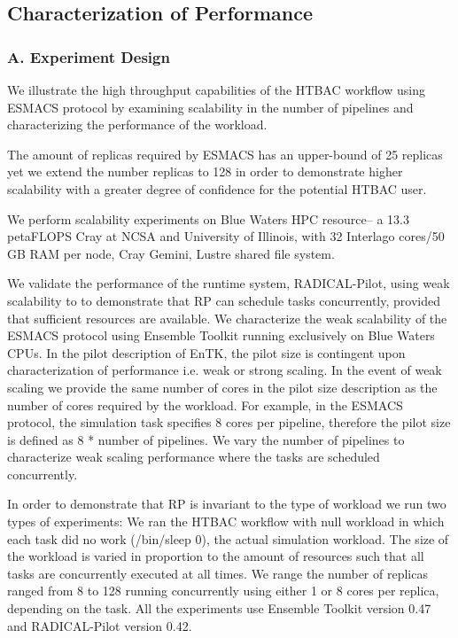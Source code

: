 \subsection{Characterization of Performance}

\subsubsection{A. Experiment Design}

We illustrate the high throughput capabilities of the HTBAC workflow using ESMACS protocol by examining scalability in the number of pipelines and characterizing the performance of the workload. 

The amount of replicas required by ESMACS has an upper-bound of 25 replicas yet we extend the number replicas to 128 in order to demonstrate higher scalability with a greater degree of confidence for the potential HTBAC user.   

We perform scalability experiments on Blue Waters HPC resource-- a 13.3 petaFLOPS Cray at NCSA and University of Illinois, with 32 Interlago cores/50 GB RAM per node, Cray Gemini, Lustre shared file system. 

We validate the performance of the runtime system, RADICAL-Pilot, using weak scalability to to demonstrate that RP can schedule tasks concurrently, provided that sufficient resources are available. We characterize the weak scalability of the ESMACS protocol using Ensemble Toolkit running exclusively on Blue Waters CPUs. In the pilot description of EnTK, the pilot size is contingent upon characterization of performance i.e. weak or strong scaling. In the event of weak scaling we provide the same number of cores in the pilot size description as the number of cores required by the workload. For example, in the ESMACS protocol, the simulation task specifies 8 cores per pipeline, therefore the pilot size is defined as 8 * number of pipelines. We vary the number of pipelines to characterize weak scaling performance where the tasks are scheduled concurrently.

In order to demonstrate that RP is invariant to the type of workload we run two types of experiments: We ran the HTBAC workflow with null workload in which each task did no work (/bin/sleep 0), the actual simulation workload. The size of the workload is varied in proportion to the amount of resources such that all tasks are concurrently executed at all times. We range the number of replicas ranged from 8 to 128 running concurrently using either 1 or 8 cores per replica, depending on the task. All the experiments use Ensemble Toolkit version 0.47 and RADICAL-Pilot version 0.42.

